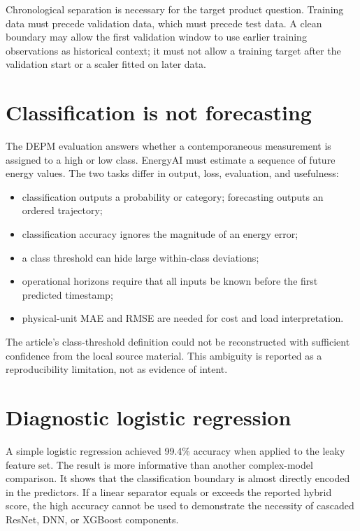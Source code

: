 Chronological separation is necessary for the target product question. Training data must precede validation data, which must precede test data. A clean boundary may allow the first validation window to use earlier training observations as historical context; it must not allow a training target after the validation start or a scaler fitted on later data.

\section{Classification is not forecasting}

The DEPM evaluation answers whether a contemporaneous measurement is assigned to a high or low class. EnergyAI must estimate a sequence of future energy values. The two tasks differ in output, loss, evaluation, and usefulness:
\begin{itemize}
  \item classification outputs a probability or category; forecasting outputs an ordered trajectory;
  \item classification accuracy ignores the magnitude of an energy error;
  \item a class threshold can hide large within-class deviations;
  \item operational horizons require that all inputs be known before the first predicted timestamp;
  \item physical-unit MAE and RMSE are needed for cost and load interpretation.
\end{itemize}

The article's class-threshold definition could not be reconstructed with sufficient confidence from the local source material. This ambiguity is reported as a reproducibility limitation, not as evidence of intent.

\section{Diagnostic logistic regression}

A simple logistic regression achieved 99.4\% accuracy when applied to the leaky feature set. The result is more informative than another complex-model comparison. It shows that the classification boundary is almost directly encoded in the predictors. If a linear separator equals or exceeds the reported hybrid score, the high accuracy cannot be used to demonstrate the necessity of cascaded ResNet, DNN, or XGBoost components.

